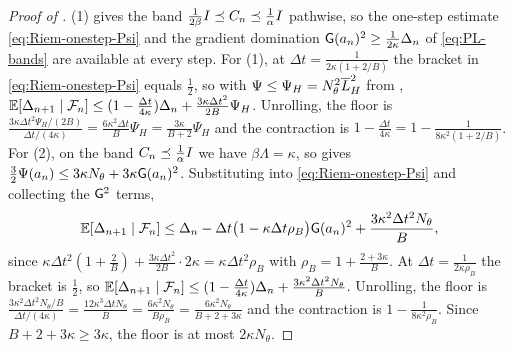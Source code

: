 \begin{proof}[Proof of ]
(1) gives the band $\tfrac1{2\beta}I\preceq C_n\preceq\tfrac1\alpha I$
pathwise, so the one-step estimate \eqref{eq:Riem-onestep-Psi} and the gradient domination
$\mathsf{G}(a_n)^2\geq\tfrac1{2\kappa}\Delta_n$ of \eqref{eq:PL-bands} are available at every step.
For (1), at $\Delta t=\tfrac1{2\kappa(1+2/B)}$ the bracket in \eqref{eq:Riem-onestep-Psi} equals
$\tfrac12$, so with $\Psi\leq\Psi_H=N_\theta^2\overline{L}_H^2$ from ,
$\mathbb{E}[\Delta_{n+1}\mid\mathcal{F}_n]\leq(1-\tfrac{\Delta t}{4\kappa})\Delta_n+\tfrac{3\kappa\Delta t^2}{2B}\Psi_H$.
Unrolling, the floor is
$\tfrac{3\kappa\Delta t^2\Psi_H/(2B)}{\Delta t/(4\kappa)}=\tfrac{6\kappa^2\Delta t}B\Psi_H=\tfrac{3\kappa}{B+2}\Psi_H$
and the contraction is $1-\tfrac{\Delta t}{4\kappa}=1-\tfrac1{8\kappa^2(1+2/B)}$.
For (2), on the band $C_n\preceq\tfrac1\alpha I$ we have $\beta\Lambda=\kappa$, so
 gives $\tfrac32\Psi(a_n)\leq3\kappa N_\theta+3\kappa\mathsf{G}(a_n)^2$.
Substituting into \eqref{eq:Riem-onestep-Psi} and collecting the $\mathsf{G}^2$ terms,
\[
    \mathbb{E}[\Delta_{n+1}\mid\mathcal{F}_n]
    \leq\Delta_n-\Delta t\bigl(1-\kappa\Delta t\rho_B\bigr)\mathsf{G}(a_n)^2+\frac{3\kappa^2\Delta t^2N_\theta}B,
\]
since $\kappa\Delta t^2(1+\tfrac2B)+\tfrac{3\kappa\Delta t^2}{2B}\cdot2\kappa=\kappa\Delta t^2\rho_B$
with $\rho_B=1+\tfrac{2+3\kappa}B$. At $\Delta t=\tfrac1{2\kappa\rho_B}$ the bracket is $\tfrac12$, so
$\mathbb{E}[\Delta_{n+1}\mid\mathcal{F}_n]\leq(1-\tfrac{\Delta t}{4\kappa})\Delta_n+\tfrac{3\kappa^2\Delta t^2N_\theta}B$.
Unrolling, the floor is
$\tfrac{3\kappa^2\Delta t^2N_\theta/B}{\Delta t/(4\kappa)}=\tfrac{12\kappa^3\Delta tN_\theta}B=\tfrac{6\kappa^2N_\theta}{B\rho_B}=\tfrac{6\kappa^2N_\theta}{B+2+3\kappa}$
and the contraction is $1-\tfrac1{8\kappa^2\rho_B}$. Since $B+2+3\kappa\geq3\kappa$, the floor is at
most $2\kappa N_\theta$.
\end{proof}

